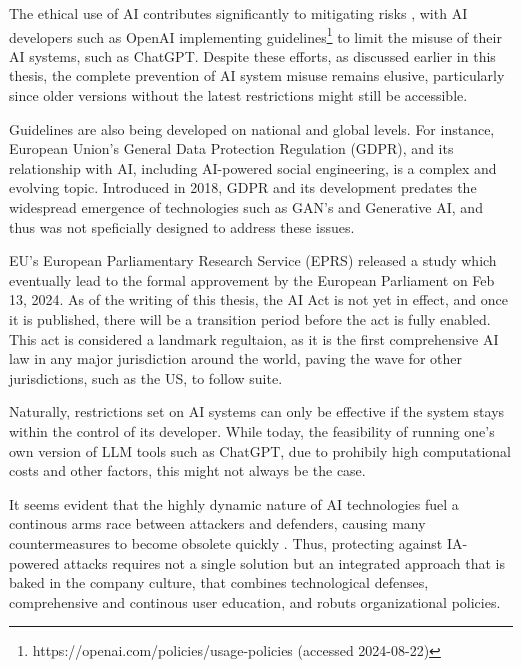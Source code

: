 The ethical use of AI contributes significantly to mitigating risks \citep{guptaFromChatGPTtoThreatGPT2023}, with AI developers such as OpenAI implementing guidelines\footnote{https://openai.com/policies/usage-policies (accessed 2024-08-22)} to limit the misuse of their AI systems, such as ChatGPT. Despite these efforts, as discussed earlier in this thesis, the complete prevention of AI system misuse remains elusive, particularly since older versions without the latest restrictions might still be accessible.

Guidelines are also being developed on national and global levels. For instance, European Union's General Data Protection Regulation (GDPR), and its relationship with AI, including AI-powered social engineering, is a complex and evolving topic. Introduced in 2018, GDPR and its development predates the widespread emergence of technologies such as GAN's and Generative AI\citep{goodfellowGenerativeAdversarialNetworks2020}, and thus was not speficially designed to address these issues.

EU's European Parliamentary Research Service (EPRS) released a study\citep{eprsTheImpactofTheGDPR2020} which eventually lead to the formal approvement by the European Parliament on Feb 13, 2024. As of the writing of this thesis, the AI Act is not yet in effect, and once it is published, there will be a transition period before the act is fully enabled. This act is considered a landmark regultaion, as it is the first comprehensive AI law in any major jurisdiction around the world, paving the wave for other jurisdictions, such as the US,  to follow suite.

Naturally, restrictions set on AI systems can only be effective if the system stays within the control of its developer.  While today, the feasibility of running one's own version of LLM tools such as ChatGPT, due to prohibily high computational costs and other factors, this might not always be the case.

It seems evident that the highly dynamic nature of AI technologies fuel a continous arms race between attackers and defenders, causing many countermeasures to become obsolete quickly \citep{fakhouriAIDrivenSolutionsForSocialEngineeringAttacks2024}. Thus, protecting against IA-powered attacks requires not a single solution but an integrated approach that is baked in the company culture, that combines technological defenses, comprehensive and continous user education, and robuts organizational policies.

